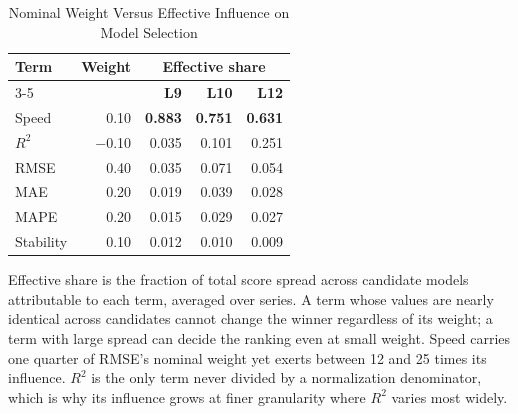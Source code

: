 \begin{table}[!t]
\caption{Nominal Weight Versus Effective Influence on Model Selection}
\label{tab:term-dominance}
\centering
\begin{tabular}{@{}lrrrr@{}}
\toprule
\multirow{2}{*}{\textbf{Term}} & \multirow{2}{*}{\textbf{Weight}} & \multicolumn{3}{c}{\textbf{Effective share}} \\
\cmidrule(l){3-5}
 & & \textbf{L9} & \textbf{L10} & \textbf{L12} \\
\midrule
Speed      & \phantom{$-$}0.10 & \textbf{0.883} & \textbf{0.751} & \textbf{0.631} \\
$R^2$      & $-$0.10           & 0.035 & 0.101 & 0.251 \\
RMSE       & \phantom{$-$}0.40 & 0.035 & 0.071 & 0.054 \\
MAE        & \phantom{$-$}0.20 & 0.019 & 0.039 & 0.028 \\
MAPE       & \phantom{$-$}0.20 & 0.015 & 0.029 & 0.027 \\
Stability  & \phantom{$-$}0.10 & 0.012 & 0.010 & 0.009 \\
\bottomrule
\end{tabular}
\vspace{2pt}
\begin{minipage}{\columnwidth}
\footnotesize
Effective share is the fraction of total score spread across candidate models
attributable to each term, averaged over series. A term whose values are nearly
identical across candidates cannot change the winner regardless of its weight;
a term with large spread can decide the ranking even at small weight. Speed
carries one quarter of RMSE's nominal weight yet exerts between 12 and 25 times
its influence. $R^2$ is the only term never divided by a normalization
denominator, which is why its influence grows at finer granularity where $R^2$
varies most widely.
\end{minipage}
\end{table}
